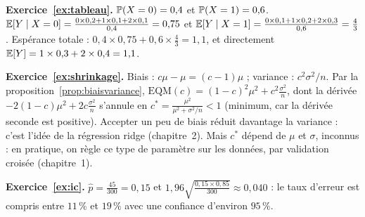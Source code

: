 \begin{corrige}
\textbf{Exercice~\ref{ex:tableau}.}
$\P(X=0)=0{,}4$ et $\P(X=1)=0{,}6$.
$\E[Y\mid X=0]=\frac{0\times0{,}2+1\times0{,}1+2\times0{,}1}{0{,}4}=0{,}75$ et $\E[Y\mid X=1]=\frac{0\times0{,}1+1\times0{,}2+2\times0{,}3}{0{,}6}=\frac43$.
Espérance totale : $0{,}4\times0{,}75+0{,}6\times\frac43=1{,}1$, et directement $\E[Y]=1\times0{,}3+2\times0{,}4=1{,}1$.
\end{corrige}

\begin{corrige}
\textbf{Exercice~\ref{ex:shrinkage}.}
Biais : $c\mu-\mu=(c-1)\mu$ ; variance : $c^2\sigma^2/n$. Par la proposition~\ref{prop:biaisvariance},
$\mathrm{EQM}(c)=(1-c)^2\mu^2+c^2\frac{\sigma^2}{n}$, dont la dérivée $-2(1-c)\mu^2+2c\frac{\sigma^2}{n}$ s'annule en $c^*=\frac{\mu^2}{\mu^2+\sigma^2/n}<1$ (minimum, car la dérivée seconde est positive).
Accepter un peu de biais réduit davantage la variance : c'est l'idée de la régression ridge (chapitre~2).
Mais $c^*$ dépend de $\mu$ et $\sigma$, inconnus : en pratique, on règle ce type de paramètre sur les données, par validation croisée (chapitre~1).
\end{corrige}

\begin{corrige}
\textbf{Exercice~\ref{ex:ic}.}
$\hat p=\frac{45}{300}=0{,}15$ et $1{,}96\sqrt{\frac{0{,}15\times0{,}85}{300}}\approx0{,}040$ : le taux d'erreur est compris entre $11\,\%$ et $19\,\%$ avec une confiance d'environ $95\,\%$.
\end{corrige}
